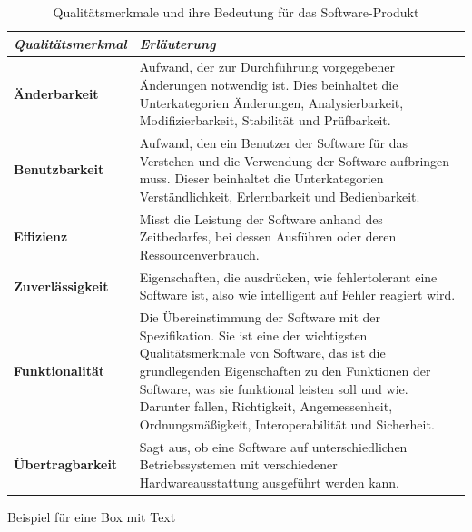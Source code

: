 \begin{table}[H]
\centering
\begin{tabular}{|l|p{9cm}|}
\hline
\rowcolor[HTML]{EFEFEF} 
\textit{\textbf{Qualitätsmerkmal}} & \textit{\textbf{Erläuterung}}       \\ \hline
\textbf{Änderbarkeit}              & Aufwand, der zur Durchführung vorgegebener Änderungen notwendig ist. Dies beinhaltet die Unterkategorien Änderungen, Analysierbarkeit, Modifizierbarkeit, Stabilität und Prüfbarkeit.
\\ \hline
\textbf{Benutzbarkeit}             &                                                                                                                                                                                                 Aufwand, den ein Benutzer der Software für das Verstehen und die Verwendung der Software aufbringen muss. Dieser beinhaltet die Unterkategorien Verständlichkeit, Erlernbarkeit und Bedienbarkeit.
 \\ \hline
\textbf{Effizienz}                 &                                                                                                                                                                                                    
Misst die Leistung der Software anhand des Zeitbedarfes, bei dessen Ausführen oder deren Ressourcenverbrauch.
\\ \hline
\textbf{Zuverlässigkeit}           &                                                                                                                                                                                                    
Eigenschaften, die ausdrücken, wie fehlertolerant eine Software ist, also wie intelligent auf Fehler reagiert wird.
\\ \hline
\textbf{Funktionalität}            &                                                                                                                                                                                                    
Die Übereinstimmung der Software mit der Spezifikation. Sie ist eine der wichtigsten Qualitätsmerkmale von Software, das ist die grundlegenden Eigenschaften zu den Funktionen der Software, was sie funktional leisten soll und wie. Darunter fallen, Richtigkeit, Angemessenheit, Ordnungsmäßigkeit, Interoperabilität und Sicherheit.
\\ \hline
\textbf{Übertragbarkeit}           &                                                                                                                                                                                                    
Sagt aus, ob eine Software auf unterschiedlichen Betriebssystemen mit verschiedener Hardwareausstattung ausgeführt werden kann.
\\ \hline
\end{tabular}
\caption{Qualitätsmerkmale und ihre Bedeutung für das Software-Produkt}
\label{quality_of_sortware}
\end{table}
Beispiel für eine Box mit Text


